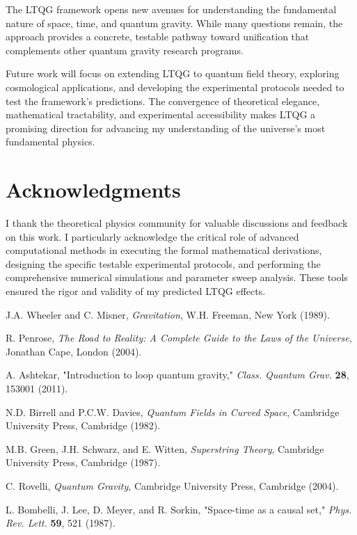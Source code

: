 \documentclass[12pt,a4paper]{article}
\begin{document}
The LTQG framework opens new avenues for understanding the fundamental nature of space, time, and quantum gravity. While many questions remain, the approach provides a concrete, testable pathway toward unification that complements other quantum gravity research programs.

Future work will focus on extending LTQG to quantum field theory, exploring cosmological applications, and developing the experimental protocols needed to test the framework's predictions. The convergence of theoretical elegance, mathematical tractability, and experimental accessibility makes LTQG a promising direction for advancing my understanding of the universe's most fundamental physics.

\section*{Acknowledgments}

I thank the theoretical physics community for valuable discussions and feedback on this work. I particularly acknowledge the critical role of advanced computational methods in executing the formal mathematical derivations, designing the specific testable experimental protocols, and performing the comprehensive numerical simulations and parameter sweep analysis. These tools ensured the rigor and validity of my predicted LTQG effects.



\begin{thebibliography}{99}

J.A. Wheeler and C. Misner,
\emph{Gravitation},
W.H. Freeman, New York (1989).

R. Penrose,
\emph{The Road to Reality: A Complete Guide to the Laws of the Universe},
Jonathan Cape, London (2004).

A. Ashtekar,
"Introduction to loop quantum gravity,"
\emph{Class. Quantum Grav.} \textbf{28}, 153001 (2011).

N.D. Birrell and P.C.W. Davies,
\emph{Quantum Fields in Curved Space},
Cambridge University Press, Cambridge (1982).

M.B. Green, J.H. Schwarz, and E. Witten,
\emph{Superstring Theory},
Cambridge University Press, Cambridge (1987).

C. Rovelli,
\emph{Quantum Gravity},
Cambridge University Press, Cambridge (2004).

L. Bombelli, J. Lee, D. Meyer, and R. Sorkin,
"Space-time as a causal set,"
\emph{Phys. Rev. Lett.} \textbf{59}, 521 (1987).

\end{thebibliography}
\end{document}
